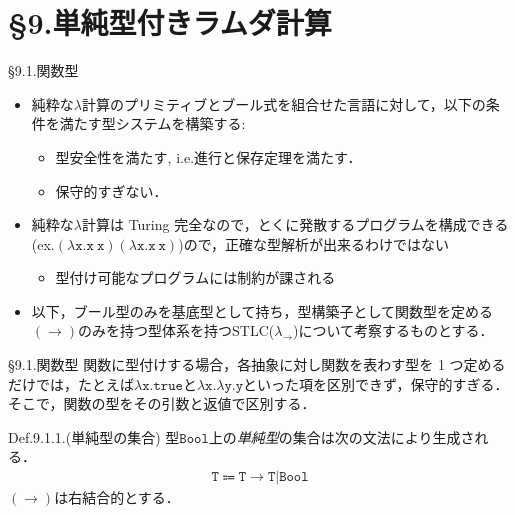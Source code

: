 \documentclass[9pt]{beamer}
\begin{document}
\section{\S9.単純型付きラムダ計算}
\begin{frame}{\S9.1.関数型}
\begin{itemize}
\item 純粋な$\lambda$計算のプリミティブとブール式を組合せた言語に対して，以下の条件を満たす型システムを構築する:\begin{itemize}
\item 型安全性を満たす, i.e.進行と保存定理を満たす．
\item 保守的すぎない．
\end{itemize}
\item 純粋な$\lambda$計算は Turing 完全なので，とくに発散するプログラムを構成できる(ex.$\mathtt{(\lambda x. x\ x)(\lambda x. x\ x)}$)ので，正確な型解析が出来るわけではない
\begin{itemize}
\item 型付け可能なプログラムには制約が課される
\end{itemize}
\item 以下，ブール型のみを基底型として持ち，型構築子として関数型を定める$(\rightarrow)$のみを持つ型体系を持つSTLC($\lambda_{\rightarrow}$)について考察するものとする．
\end{itemize}
\end{frame}
\begin{frame}{\S9.1.関数型}
関数に型付けする場合，各抽象に対し関数を表わす型を 1 つ定めるだけでは，たとえば$\mathtt{\lambda x. true}$と$\mathtt{\lambda x. \lambda y.y}$といった項を区別できず，保守的すぎる．そこで，関数の型をその引数と返値で区別する．
\begin{dblock}{Def.9.1.1.(単純型の集合)}
型$\mathtt{Bool}$上の\emph{単純型}の集合は次の文法により生成される．
\begin{align*}
\mathtt{T}\Coloneq\mathtt{T\rightarrow T}|\mathtt{Bool}
\end{align*}
$(\rightarrow)$は右結合的とする．
\end{dblock}
\end{frame}
\end{document}
